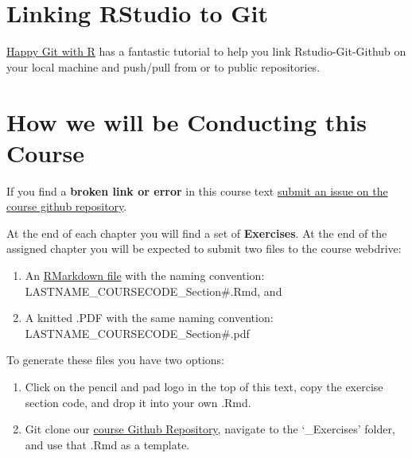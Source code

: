 \documentclass[
  letterpaper,
]{book}
\begin{document}
\section*{Linking RStudio to Git}\label{linking-rstudio-to-git}


\href{https://happygitwithr.com/rstudio-git-github.html}{Happy Git with
R} has a fantastic tutorial to help you link Rstudio-Git-Github on your
local machine and push/pull from or to public repositories.

\section*{How we will be Conducting this
Course}\label{how-we-will-be-conducting-this-course}


If you find a \textbf{broken link or error} in this course text
\href{https://github.com/katharynduffy/katharynduffy.github.io/issues}{submit
an issue on the course github repository}.

At the end of each chapter you will find a set of \textbf{Exercises}. At
the end of the assigned chapter you will be expected to submit two files
to the course webdrive:

\begin{enumerate}
\def\labelenumi{\arabic{enumi}.}
\item
  An
  \href{https://rstudio.com/wp-content/uploads/2015/02/rmarkdown-cheatsheet.pdf}{RMarkdown
  file} with the naming convention: LASTNAME\_COURSECODE\_Section\#.Rmd,
  and
\item
  A knitted .PDF with the same naming convention:
  LASTNAME\_COURSECODE\_Section\#.pdf
\end{enumerate}

To generate these files you have two options:

\begin{enumerate}
\def\labelenumi{\arabic{enumi}.}
\item
  Click on the pencil and pad logo in the top of this text, copy the
  exercise section code, and drop it into your own .Rmd.
\item
  Git clone our
  \href{https://github.com/katharynduffy/katharynduffy.github.io}{course
  Github Repository}, navigate to the `\_Exercises' folder, and use that
  .Rmd as a template.
\end{enumerate}
\end{document}
